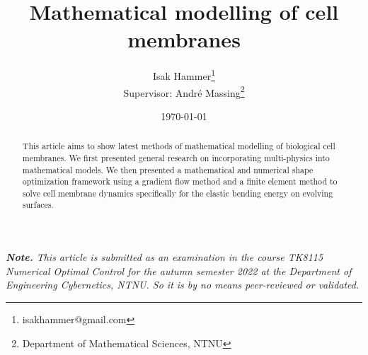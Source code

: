 \documentclass[10.8pt, a4paper, USenglish, twocolumn]{article}
\title{ {\Large \textbf{Mathematical modelling of cell membranes }} }
\author{Isak Hammer\footnote{isakhammer@gmail.com} \\{\small Supervisor: André Massing\footnote{Department of Mathematical Sciences, NTNU}} }
\date{\today}
\begin{document}
\maketitle
\begin{sloppy}
\textit{ \textbf{Note.} This article is submitted as an examination in the course TK8115 Numerical Optimal Control for the autumn semester 2022 at the Department of Engineering Cybernetics, NTNU. So it is by no means peer-reviewed or validated.}


\begin{abstract}
This article aims to show latest methods of mathematical modelling of biological cell membranes. We first presented general research on incorporating multi-physics into mathematical models. We then presented a mathematical and numerical shape optimization framework using a gradient flow method and a finite element method to solve cell membrane dynamics specifically for the elastic bending energy on evolving surfaces.
\end{abstract}

    
    
    
    
    

    \printbibliography
\end{sloppy}
\end{document}
